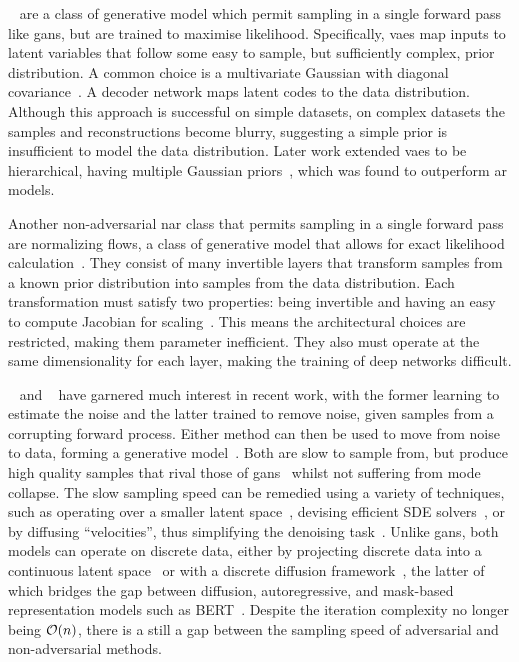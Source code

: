 ~\cite{kingma2013vae} are a class of generative model which
permit sampling in a single forward pass like \glspl{gan}, but are trained to
maximise likelihood. Specifically, \glspl{vae} map inputs to latent variables
that follow some easy to sample, but sufficiently complex, prior distribution. A
common choice is a multivariate Gaussian with diagonal
covariance~\cite{kingma2013vae}. A decoder network maps latent codes to the data
distribution. Although this approach is successful on simple datasets, on
complex datasets the samples and reconstructions become blurry, suggesting a
simple prior is insufficient to model the data distribution. Later work extended
\glspl{vae} to be hierarchical, having multiple Gaussian
priors~\cite{arash2020nvae,child2020vqvae}, which was found to outperform
\gls{ar} models.

Another non-adversarial \gls{nar} class that permits sampling in a single
forward pass are normalizing flows, a class of generative model that allows for
exact likelihood calculation~\cite{dinh2014nice,dinh2016density,kingma2018glow}.
They consist of many invertible layers that transform samples from a known prior
distribution into samples from the data distribution. Each transformation must
satisfy two properties: being invertible and having an easy to compute Jacobian
for scaling~\cite{dinh2014nice,dinh2016density}. This means the architectural
choices are restricted, making them parameter inefficient. They also must
operate at the same dimensionality for each layer, making the training of deep
networks difficult.

~\cite{ho2020ddpm,dhariwal2021ddpm} and
~\cite{song2019sbm,song2020sde,song2021mlt,vahdat2021sbmlatent}
have garnered much interest in recent work, with the former learning to estimate
the noise and the latter trained to remove noise, given samples from a
corrupting forward process. Either method can then be used to move from 
noise to data, forming a generative model~\cite{song2019sbm}. Both are slow to
sample from, but produce high quality samples that rival those of
\glspl{gan}~\cite{dhariwal2021ddpm} whilst not suffering from mode collapse. The
slow sampling speed can be remedied using a variety of techniques, such as
operating over a smaller latent space~\cite{vahdat2021sbmlatent}, devising
efficient SDE solvers~\cite{martineau2021fast}, or by diffusing ``velocities'',
thus simplifying the denoising task~\cite{dockhorn2021langevin}. Unlike
\glspl{gan}, both models can operate on discrete data, either by projecting
discrete data into a continuous latent space~\cite{vahdat2021sbmlatent} or with
a discrete diffusion framework~\cite{austin2021structured}, the latter of which
bridges the gap between diffusion, autoregressive, and mask-based representation
models such as BERT~\cite{devlin2019bert}. Despite the iteration complexity no
longer being $\mathcal{O}(n)$, there is a still a gap between the sampling speed of
adversarial and non-adversarial methods.

